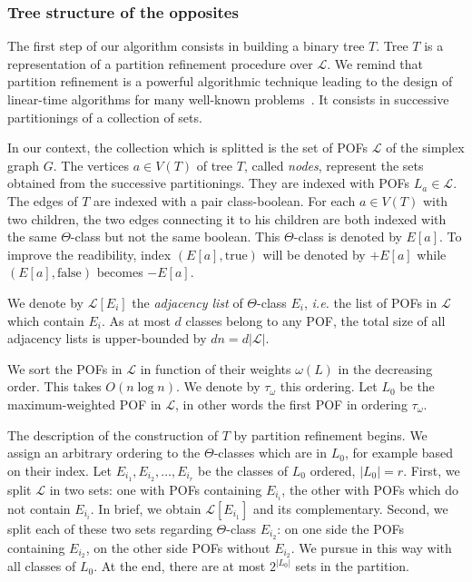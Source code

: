 \documentclass[a4paper,UKenglish,numberwithinsect,cleveref, autoref,anonymous]{lipics-v2021}
\newcommand{\card}[1]{\left| #1 \right|}
\begin{document}
\subsubsection{Tree structure of the opposites} \label{subsubsec:tree_opp}

The first step of our algorithm consists in building a binary tree $T$. Tree $T$ is a representation of a partition refinement procedure over $\mathcal{L}$. We remind that partition refinement is a powerful algorithmic technique leading to the design of linear-time algorithms for many well-known problems~\cite{HaPaVi99,PaTa87}. It consists in successive partitionings of a collection of sets.

In our context, the collection which is splitted is the set of POFs $\mathcal{L}$ of the simplex graph $G$. The vertices $a \in V(T)$ of tree $T$, called \textit{nodes}, represent the sets obtained from the successive partitionings. They are indexed with POFs $L_a \in \mathcal{L}$. The edges of $T$ are indexed with a pair class-boolean. For each $a \in V(T)$ with two children, the two edges connecting it to his children are both indexed with the same $\Theta$-class but not the same boolean. This $\Theta$-class is denoted by $E\left[a\right]$. To improve the readibility, index $(E\left[a\right],\mbox{true})$ will be denoted by $+E\left[a\right]$ while $(E\left[a\right],\mbox{false})$ becomes $-E\left[a\right]$.

We denote by $\mathcal{L}\left[E_i\right]$ the \textit{adjacency list} of $\Theta$-class $E_i$, {\em i.e.} the list of POFs in $\mathcal{L}$ which contain $E_i$. As at most $d$ classes belong to any POF, the total size of all adjacency lists is upper-bounded by $dn = d\card{\mathcal{L}}$.

We sort the POFs in $\mathcal{L}$ in function of their weights $\omega(L)$ in the decreasing order. This takes $O(n\log n)$. We denote by $\tau_{\omega}$ this ordering. Let $L_0$ be the maximum-weighted POF in $\mathcal{L}$, in other words the first POF in ordering $\tau_{\omega}$.

The description of the construction of $T$ by partition refinement begins. We assign an arbitrary ordering to the $\Theta$-classes which are in $L_0$, for example based on their index. Let $E_{i_1}, E_{i_2},\ldots, E_{i_r}$ be the classes of $L_0$ ordered, $\card{L_0} = r$. First, we split $\mathcal{L}$ in two sets: one with POFs containing $E_{i_i}$, the other with POFs which do not contain $E_{i_i}$. In brief, we obtain $\mathcal{L}\left[E_{i_1}\right]$ and its complementary. Second, we split each of these two sets regarding $\Theta$-class $E_{i_2}$: on one side the POFs containing $E_{i_2}$, on the other side POFs without $E_{i_2}$. We pursue in this way with all classes of $L_0$. At the end, there are at most $2^{\card{L_0}}$ sets in the partition.
\end{document}
